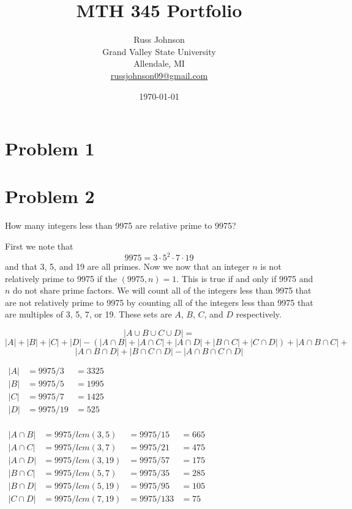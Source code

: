 \documentclass{article}
\title{{\bf MTH 345 Portfolio}}
\author{Russ Johnson\\
Grand Valley State University\\
Allendale, MI\\
\url{russjohnson09@gmail.com}\\
}
\date{\today}
\begin{document}
\maketitle
\newpage

\section*{Problem 1}



\section*{Problem 2}

How many integers less than 9975 are relative prime to 9975?

First we note that
\[9975 = 3\cdot 5^2 \cdot 7 \cdot 19\]
and that 3, 5, and 19 are all primes. Now we now that an integer $n$ is not relatively prime to 9975 if the $(9975,n)=1$. This is true if and only if 9975 and $n$ do not share prime factors. We will count all of the integers less than 9975 that are not relatively prime to 9975 by counting all of the integers less than 9975 that are multiples of 3, 5, 7, or 19. These sets are $A$, $B$, $C$, and $D$ respectively.


\[|A\cup B \cup C\cup D|=\]
\[|A| + |B| + |C| + |D| - (|A\cap B|+|A\cap C|+|A\cap D|+|B\cap C|+|C\cap D|)+|A\cap B\cap C|+\]
\[|A\cap B\cap D|+|B\cap C\cap D| -|A\cap B\cap C\cap D|\]
\begin{center}
$
\begin{array}{rll}
|A| &= 9975/3&=3325\\
|B| &= 9975/5&=1995\\
|C| &= 9975/7&=1425\\
|D| &= 9975/19&=525\\
\end{array}
$
\end{center}


\begin{center}
$
\begin{array}{rlll}
|A\cap B| &= 9975/lcm(3,5)&=9975/15&=665\\
|A\cap C| &= 9975/lcm(3,7)&=9975/21&=475\\
|A\cap D| &= 9975/lcm(3,19)&=9975/57&=175\\
|B\cap C| &= 9975/lcm(5,7)&=9975/35&=285\\
|B\cap D| &= 9975/lcm(5,19)&=9975/95&=105\\
|C\cap D| &= 9975/lcm(7,19)&=9975/133&=75\\
\end{array}
$
\end{center}
\end{document}
